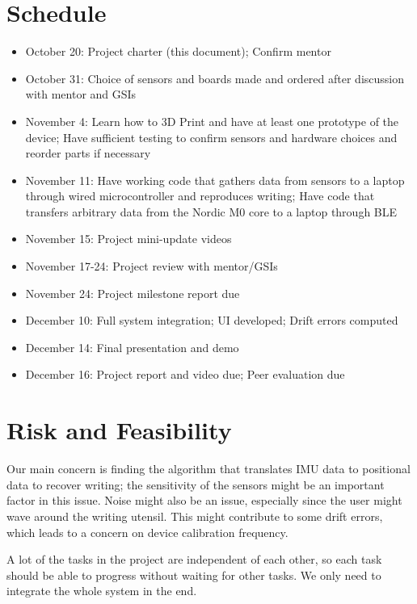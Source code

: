 \documentclass[12pt,journal]{IEEEtran}
\begin{document}
\newpage

\section{Schedule}
\begin{itemize}
\item October 20: Project charter (this document); Confirm mentor
\item October 31: Choice of sensors and boards made and ordered after discussion with mentor and GSIs
\item November 4: Learn how to 3D Print and have at least one prototype of the device; Have sufficient testing to confirm sensors and hardware choices and reorder parts if necessary
\item November 11: Have working code that gathers data from sensors to a laptop through wired microcontroller and reproduces writing; Have code that transfers arbitrary data from the Nordic M0 core to a laptop through BLE
\item November 15: Project mini-update videos
\item November 17-24: Project review with mentor/GSIs
\item November 24: Project milestone report due
\item December 10: Full system integration; UI developed; Drift errors computed
\item December 14: Final presentation and demo
\item December 16: Project report and video due; Peer evaluation due
\end{itemize}


\section{Risk and Feasibility}
Our main concern is finding the algorithm that translates IMU data to positional data to recover writing; the sensitivity of the sensors might be an important factor in this issue. Noise might also be an issue, especially since the user might wave around the writing utensil. This might contribute to some drift errors, which leads to a concern on device calibration frequency. 

A lot of the tasks in the project are independent of each other, so each task should be able to progress without waiting for other tasks. We only need to integrate the whole system in the end.


\end{document}
